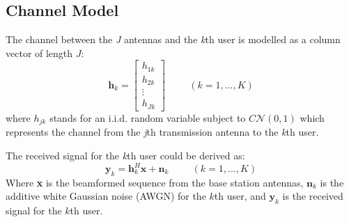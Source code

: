 \documentclass{article}
\begin{document}
\subsection{Channel Model}
The channel between the \textit{J} antennas and the \textit{k}th user is modelled as a column vector of length $\textit{J}$:
\[
\textbf{h}_k
=
\begin{bmatrix}
    h_{1k} \\
    h_{2k} \\
    \vdots\\
    h_{Jk}
\end{bmatrix} \hspace{1cm}(k = 1,...,K)
\]
where $h_{jk}$ stands for an i.i.d. random variable subject to $C\mathcal{N}(0,1)$ which represents the channel from the \textit{j}th
transmission antenna to the \textit{k}th user.

\noindent
The received signal for the \textit{k}th user could be derived as:
\[
\textbf{y}_k = \textbf{h}_k^H\textbf{x}+\textbf{n}_k \hspace{1cm}(k = 1,...,K)
\]
Where \textbf{x} is the beamformed sequence from the base station antennas,
$\textbf{n}_k$ is the additive white Gaussian noise (AWGN) for the $\textit{k}$th user,
and $\textbf{y}_k$ is the received signal for the $\textit{k}$th user.
\end{document}
